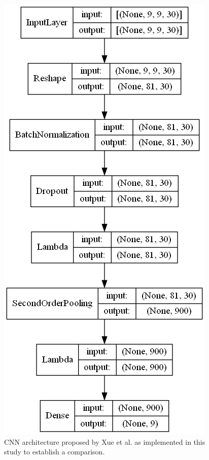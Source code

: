\begin{figure}[ht]
    \centering
    \includegraphics[width=.7\linewidth]{figs/vineyard_classification/networks/aspn_9x8_32.png}
	\caption{CNN architecture proposed by Xue et al. \cite{xue_attention-based_2021} as implemented in this study to establish a comparison. }
	\label{fig:aspn_cnn}
\end{figure}

